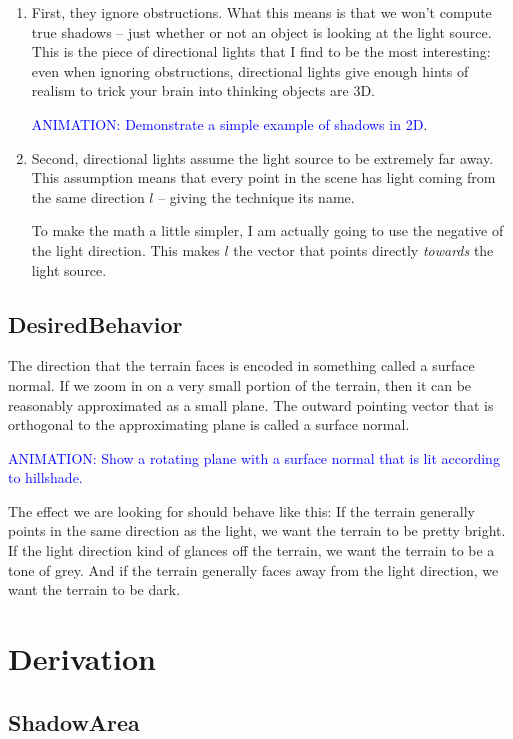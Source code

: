 \documentclass{article}
\newcommand\animation[1]{\textcolor{blue}{ANIMATION: #1}}
\begin{document}
\begin{enumerate}

\item First, they ignore obstructions.
What this means is that we won't compute true shadows -- just whether or not an object is looking at the light source.
This is the piece of directional lights that I find to be the most interesting: even when ignoring obstructions, directional lights give enough hints of realism to trick your brain into thinking objects are 3D.

\animation{Demonstrate a simple example of shadows in 2D}.
	
\item Second, directional lights assume the light source to be extremely far away.
This assumption means that every point in the scene has light coming from the same direction $l$ -- giving the technique its name.

To make the math a little simpler, I am actually going to use the negative of the light direction.
This makes $l$ the vector that points directly \textit{towards} the light source.

\end{enumerate}

\subsection{DesiredBehavior}

The direction that the terrain faces is encoded in something called a surface normal.
If we zoom in on a very small portion of the terrain, then it can be reasonably approximated as a small plane.
The outward pointing vector that is orthogonal to the approximating plane is called a surface normal.

\animation{Show a rotating plane with a surface normal that is lit according to hillshade.}

The effect we are looking for should behave like this:
If the terrain generally points in the same direction as the light, we want the terrain to be pretty bright.
If the light direction kind of glances off the terrain, we want the terrain to be a tone of grey.
And if the terrain generally faces away from the light direction, we want the terrain to be dark.

\section{Derivation}

\subsection{ShadowArea}
\end{document}
